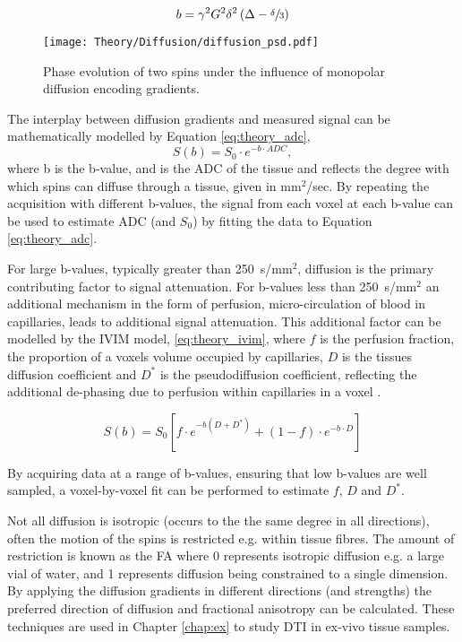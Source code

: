 \begin{equation}
	b=\gamma^2 G^2 \delta^2 \left( \Delta - \sfrac{\delta}{3}\right)
	\label{eq:theory_stejskal_tanner}
\end{equation}

\begin{figure}[H]
	\centering
	\texttt{[image: Theory/Diffusion/diffusion\_psd.pdf]}
	\caption{Phase evolution of two spins under the influence of monopolar diffusion encoding gradients.}
	\label{fig:theory_diffusion_psd}	
\end{figure}

The interplay between diffusion gradients and measured signal can be mathematically modelled by Equation \eqref{eq:theory_adc},
\begin{equation}
	S\left( b \right) = S_0 \cdot e^{-b \cdot ADC},
	\label{eq:theory_adc}
\end{equation}
where b is the b-value, and  is the \acl{ADC} of the tissue and reflects the degree with which spins can diffuse through a tissue, given in mm$^2$/sec. By repeating the acquisition with different b-values, the signal from each voxel at each b-value can be used to estimate \ac{ADC} (and $S_0$) by fitting the data to Equation \eqref{eq:theory_adc}.

For large b-values, typically greater than 250~s/mm$^2$, diffusion is the primary contributing factor to signal attenuation. For b-values less than 250~s/mm$^2$ an additional mechanism in the form of perfusion, micro-circulation of blood in capillaries, leads to additional signal attenuation. This additional factor can be modelled by the \ac{IVIM} model, \eqref{eq:theory_ivim}, where $f$ is the perfusion fraction, the proportion of a voxels volume occupied by capillaries, $D$ is the tissues diffusion coefficient and $D^*$ is the pseudodiffusion coefficient, reflecting the additional de-phasing due to perfusion within capillaries in a voxel \cite{le_bihan_mr_1986,le_bihan_separation_1988}.

\begin{equation}
	S\left( b \right) = S_0 \left[ f \cdot e^{-b\left(D + D^*\right)} + \left( 1 - f\right) \cdot e^{-b \cdot D}\right]
	\label{eq:theory_ivim}
\end{equation}

By acquiring data at a range of b-values, ensuring that low b-values are well sampled, a voxel-by-voxel fit can be performed to estimate $f$, $D$ and $D^*$.

Not all diffusion is isotropic (occurs to the the same degree in all directions), often the motion of the spins is restricted e.g. within tissue fibres. The amount of restriction is known as the \ac{FA} where 0 represents isotropic diffusion e.g. a large vial of water, and 1 represents diffusion being constrained to a single dimension. By applying the diffusion gradients in different directions (and strengths) the preferred direction of diffusion and fractional anisotropy can be calculated. These techniques are used in Chapter \ref{chap:ex} to study \ac{DTI} in ex-vivo tissue samples.


